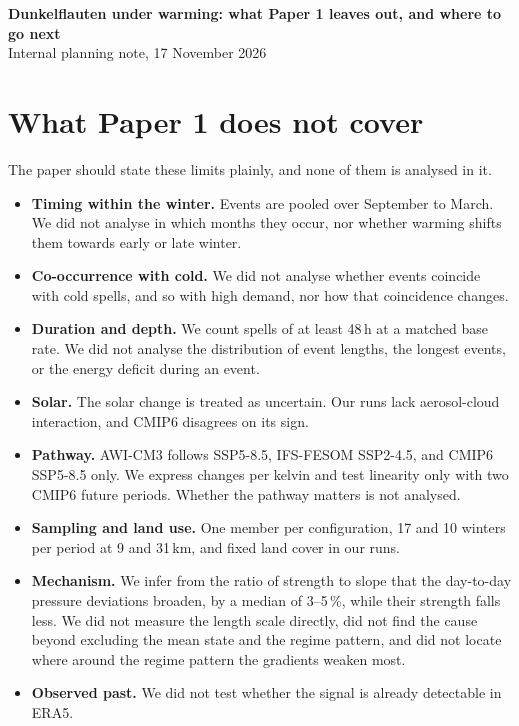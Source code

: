 \documentclass[10pt,a4paper]{article}
\begin{document}
{\large\bfseries Dunkelflauten under warming: what Paper 1 leaves out, and where to go next}\\[2pt]
{\small Internal planning note, 17 November 2026}

\section{What Paper 1 does not cover}

The paper should state these limits plainly, and none of them is analysed in it.
\begin{itemize}
\item \textbf{Timing within the winter.} Events are pooled over September to March. We did not analyse in which
      months they occur, nor whether warming shifts them towards early or late winter.
\item \textbf{Co-occurrence with cold.} We did not analyse whether events coincide with cold spells, and so with high
      demand, nor how that coincidence changes.
\item \textbf{Duration and depth.} We count spells of at least 48\,h at a matched base rate. We did not analyse the
      distribution of event lengths, the longest events, or the energy deficit during an event.
\item \textbf{Solar.} The solar change is treated as uncertain. Our runs lack aerosol-cloud interaction, and CMIP6
      disagrees on its sign.
\item \textbf{Pathway.} AWI-CM3 follows SSP5-8.5, IFS-FESOM SSP2-4.5, and CMIP6 SSP5-8.5 only. We express changes per
      kelvin and test linearity only with two CMIP6 future periods. Whether the pathway matters is not analysed.
\item \textbf{Sampling and land use.} One member per configuration, 17 and 10 winters per period at 9 and 31\,km, and
      fixed land cover in our runs.
\item \textbf{Mechanism.} We infer from the ratio of strength to slope that the day-to-day pressure deviations
      broaden, by a median of 3--5\,\%, while their strength falls less. We did not measure the length scale
      directly, did not find the cause beyond excluding the mean state and the regime pattern, and did not locate
      where around the regime pattern the gradients weaken most.
\item \textbf{Observed past.} We did not test whether the signal is already detectable in ERA5.
\end{itemize}
\end{document}

